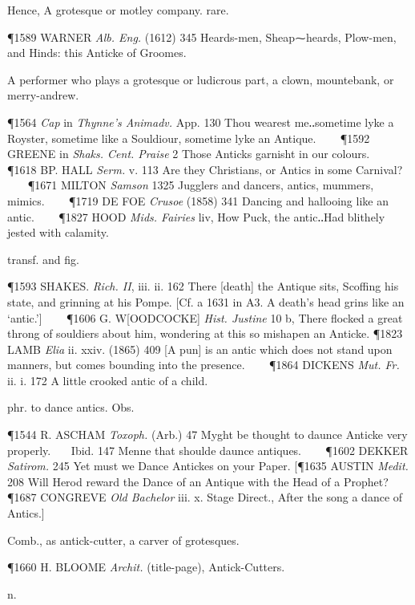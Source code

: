 \begin{description}[wide, labelwidth=!, labelindent=0pt]
\begin{myenumerate}
 Hence, A grotesque or motley company. rare. 

\P 1589 WARNER \textit{Alb. Eng.} (1612) 345 Heards-men, Sheap⁓heards, Plow-men, and
Hinds: this Anticke of Groomes.

 A performer who plays a grotesque or ludicrous part, a clown, mountebank,
or merry-andrew. 

\P 1564 \textit{Cap} in \textit{Thynne's Animadv.} App. 130 Thou wearest me‥sometime lyke a
Royster, sometime like a Souldiour, sometime lyke an Antique.    
\P 1592 GREENE in \textit{Shaks. Cent. Praise} 2 Those Anticks garnisht in our colours.    
\P 1618 BP. HALL \textit{Serm.} v. 113 Are they Christians, or Antics in some Carnival?    
\P 1671 MILTON \textit{Samson} 1325 Jugglers and dancers, antics, mummers, mimics.    
\P 1719 DE FOE \textit{Crusoe} (1858) 341 Dancing and hallooing like an antic.    
\P 1827 HOOD \textit{Mids. Fairies} liv,
How Puck, the antic‥Had blithely jested with calamity.

 transf. and fig. 

\P 1593 SHAKES. \textit{Rich. II}, iii. ii. 162 There [death] the Antique sits, Scoffing
his state, and grinning at his Pompe. [Cf. a 1631 in A3. A death's head grins
like an ‘antic.’]    
\P 1606 G. W[OODCOCKE] \textit{Hist. Justine} 10 b, There flocked a
great throng of souldiers about him, wondering at this so mishapen an Anticke.
\P 1823 LAMB \textit{Elia} ii. xxiv. (1865) 409 [A pun] is an antic which does not stand
upon manners, but comes bounding into the presence.    
\P 1864 DICKENS \textit{Mut. Fr.} ii. i. 172 A little crooked antic of a child.

 phr. to dance antics. Obs. 

\P 1544 R. ASCHAM \textit{Toxoph.} (Arb.) 47 Myght be thought to daunce Anticke very
properly.    Ibid. 147 Menne that shoulde daunce antiques.    
\P 1602 DEKKER \textit{Satirom.} 245 Yet must we Dance Antickes on your Paper.
[\P 1635 AUSTIN \textit{Medit.}
208 Will Herod reward the Dance of an Antique with the Head of a Prophet?
\P 1687 CONGREVE \textit{Old Bachelor} iii. x. Stage Direct., After the song a dance of
Antics.]

 Comb., as antick-cutter, a carver of grotesques. 

\P 1660 H. BLOOME \textit{Archit.} (title-page), Antick-Cutters.
\end{myenumerate}

 n.


\end{description}

